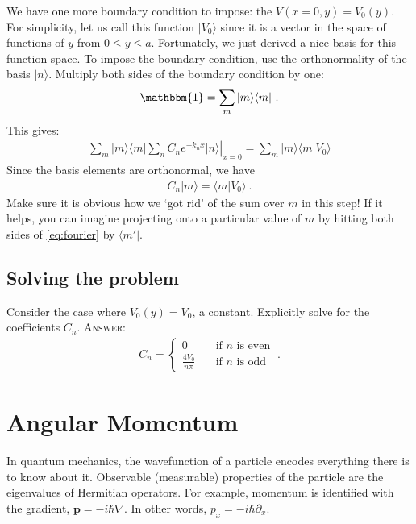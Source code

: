 \documentclass[12pt]{article}
\numberwithin{equation}{section}    %
\renewcommand{\vec}[1]{\mathbf{#1}} %
\begin{document}
We have one more boundary condition to impose: the $V(x=0,y) = V_0(y)$. For simplicity, let us call this function $|V_0\rangle$ since it is a vector in the space of functions of $y$ from $0\leq y \leq a$. Fortunately, we just derived a nice basis for this function space. To impose the boundary condition, use the orthonormality of the basis $|n\rangle$. Multiply both sides of the boundary condition by one:
\begin{align}
	\mathbbm{1} = \sum_m |m\rangle \langle m| \ .
\end{align}
This gives:
\begin{align}
	\sum_m |m\rangle \langle m|
	\sum_n \left.C_n e^{-k_n x} |n\rangle\right|_{x=0}
	= 
	\sum_m |m\rangle \langle m| V_0\rangle
	\label{eq:fourier}
\end{align}
Since the basis elements are orthonormal, we have
\begin{align}
	C_n |m\rangle = \langle m| V_0\rangle \ .
\end{align}
Make sure it is obvious how we `got rid' of the sum over $m$ in this step! If it helps, you can imagine projecting onto a particular value of $m$ by hitting both sides of \eqref{eq:fourier} by $\langle m'|$.

\subsection{Solving the problem}

Consider the case where $V_0(y) = V_0$, a constant. Explicitly solve for the coefficients $C_n$. \textsc{Answer:}
\begin{align}
	C_n = 
	\begin{cases}
	0 & \quad\text{if $n$ is even} \\
	\frac{4V_0}{n\pi} &\quad\text{if $n$ is odd} 
	\end{cases} \ .
\end{align}










\section{Angular Momentum}

In quantum mechanics, the wavefunction of a particle encodes everything there is to know about it. Observable (measurable) properties of the particle are the eigenvalues of Hermitian operators. For example, momentum is identified with the gradient, $\vec{p} = -i\hbar \nabla$. In other words, $p_x = -i\hbar \partial_x$. 
\end{document}
